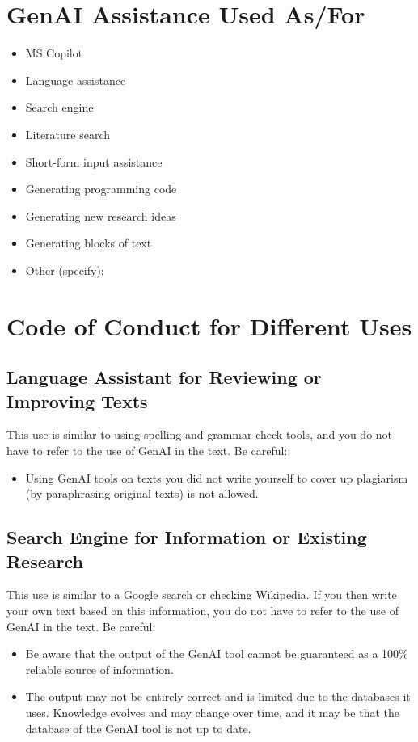 \section*{GenAI Assistance Used As/For}
\begin{itemize}
    \item[$\Box$] MS Copilot \\
    \item[$\boxtimes$] Language assistance \\
    \item[$\boxtimes$] Search engine \\
    \item[$\Box$] Literature search \\
    \item[$\Box$] Short-form input assistance \\
    \item[$\Box$] Generating programming code \\
    \item[$\Box$] Generating new research ideas \\
    \item[$\Box$] Generating blocks of text \\
    \item[$\Box$] Other (specify): \underline{\hspace{5cm}}
\end{itemize}

\section*{Code of Conduct for Different Uses}
\subsection*{Language Assistant for Reviewing or Improving Texts}
This use is similar to using spelling and grammar check tools, and you do not have to refer to the use of GenAI in the text. Be careful:
\begin{itemize}
    \item Using GenAI tools on texts you did not write yourself to cover up plagiarism (by paraphrasing original texts) is not allowed.
\end{itemize}

\subsection*{Search Engine for Information or Existing Research}
This use is similar to a Google search or checking Wikipedia. If you then write your own text based on this information, you do not have to refer to the use of GenAI in the text. Be careful:
\begin{itemize}
    \item Be aware that the output of the GenAI tool cannot be guaranteed as a 100\% reliable source of information.
    \item The output may not be entirely correct and is limited due to the databases it uses. Knowledge evolves and may change over time, and it may be that the database of the GenAI tool is not up to date.
\end{itemize}

